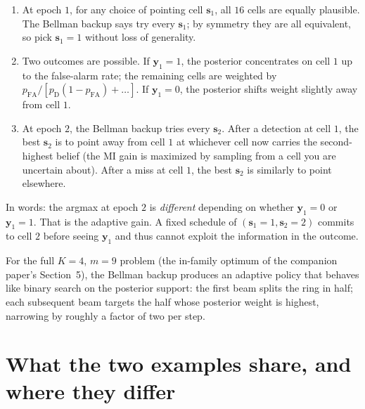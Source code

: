 \documentclass[11pt]{article}
\newcommand{\by}{\bm{y}}
\newcommand{\bs}{\bm{s}}
\begin{document}
\begin{enumerate}[nosep, leftmargin=*]
\item At epoch $1$, for any choice of pointing cell $\bs_1$, all $16$ cells are equally plausible.  The Bellman backup says try every $\bs_1$; by symmetry they are all equivalent, so pick $\bs_1 = 1$ without loss of generality.
\item Two outcomes are possible.  If $\by_1 = 1$, the posterior concentrates on cell $1$ up to the false-alarm rate; the remaining cells are weighted by $p_\mathrm{FA} / [p_\mathrm{D} (1 - p_\mathrm{FA}) + \ldots]$.  If $\by_1 = 0$, the posterior shifts weight slightly away from cell $1$.
\item At epoch $2$, the Bellman backup tries every $\bs_2$.  After a detection at cell $1$, the best $\bs_2$ is to point away from cell $1$ at whichever cell now carries the second-highest belief (the MI gain is maximized by sampling from a cell you are uncertain about).  After a miss at cell $1$, the best $\bs_2$ is similarly to point elsewhere.
\end{enumerate}

In words: the argmax at epoch $2$ is \emph{different} depending on whether $\by_1 = 0$ or $\by_1 = 1$.  That is the adaptive gain.  A fixed schedule of $(\bs_1 = 1, \bs_2 = 2)$ commits to cell $2$ before seeing $\by_1$ and thus cannot exploit the information in the outcome.

For the full $K = 4$, $m = 9$ problem (the in-family optimum of the companion paper's Section~5), the Bellman backup produces an adaptive policy that behaves like binary search on the posterior support: the first beam splits the ring in half; each subsequent beam targets the half whose posterior weight is highest, narrowing by roughly a factor of two per step.

\section{What the two examples share, and where they differ}
\label{sec:comparison}
\end{document}

